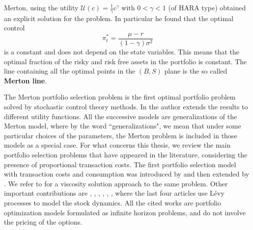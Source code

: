 Merton, using the utility $\mathcal{U}(c) = \frac{1}{\gamma} c^{\gamma}$ with $0<\gamma<1$ (of HARA type) obtained an explicit solution for the problem. In particular he found that 
the optimal control
\begin{equation}\label{Merton_policy}
  \pi^*_t = \frac{\mu-r}{(1-\gamma)\sigma^2}
\end{equation}
is a constant and does not depend on the state variables.  
This means that the optimal fraction of the risky and risk free assets in the portfolio is constant.
The line containing all the optimal points in the $(B,S)$ plane is the so called \textbf{Merton line}.


\noindent
The Merton portfolio selection problem is the first optimal portfolio problem solved by stochastic control theory methods. 
In \cite{Me71} the author extends the results to different utility functions.
All the successive models are generalizations of the Merton model, where by 
the word ``generalizations", we mean that under some particular choices of the parameters, the Merton problem is included in those models as a special case.
For what concerns this thesis, we review the main portfolio selection problems that have appeared in the literature, considering the presence of proportional transaction costs.
The first portfolio selection model with transaction costs and consumption was introduced by \cite{Co86} and then extended by \cite{DaNo90}. We refer to \cite{ShSo94}
for a viscosity solution approach to the same problem. 
Other important contributions are 
\cite{DaYi09}, \cite{Dai10}, \cite{LiuLo02}, \cite{LiuLo07}, \cite{BKR01}, \cite{OkSu01}, \cite{Kab16} where the last four articles use Lévy processes to model the stock dynamics. 
All the cited works are portfolio optimization models formulated as infinite horizon problems, and do not involve the pricing of the options.

